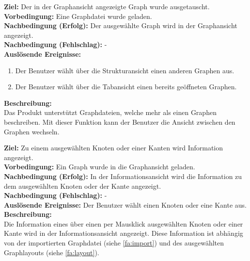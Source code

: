 \label{fa:graphwechsel}
\textbf{Ziel:} Der in der Graphansicht angezeigte Graph wurde ausgetauscht. \\
\textbf{Vorbedingung:} Eine Graphdatei wurde geladen.\\
\textbf{Nachbedingung (Erfolg):} Der ausgewählte Graph wird in der Graphansicht angezeigt.\\
\textbf{Nachbedingung (Fehlschlag):} -\\
\textbf{Auslösende Ereignisse:}
\begin{enumerate}[nolistsep, label=(\alph*)]
  \item Der Benutzer wählt über die Strukturansicht einen anderen Graphen aus.
  \item Der Benutzer wählt über die Tabansicht einen bereits geöffneten Graphen. %
\end{enumerate}
\textbf{Beschreibung:}\\
Das Produkt unterstützt Graphdateien, welche mehr als einen Graphen beschreiben.
Mit dieser Funktion kann der Benutzer die Ansicht zwischen den Graphen wechseln.

\label{fa:infoanzeige}
\textbf{Ziel:} Zu einem ausgewählten Knoten oder einer Kanten wird Information angezeigt.\\
\textbf{Vorbedingung:} Ein Graph wurde in die Graphansicht geladen.\\
\textbf{Nachbedingung (Erfolg):} In der Informationsansicht wird die Information zu dem ausgewählten Knoten oder der Kante angezeigt.\\
\textbf{Nachbedingung (Fehlschlag):} -\\
\textbf{Auslösende Ereignisse:} Der Benutzer wählt einen Knoten oder eine Kante aus.\\
\textbf{Beschreibung:}\\
Die Information eines über einen per Mausklick ausgewählten Knoten oder einer Kante wird in der Informationsansicht angezeigt. Diese Information ist abhängig von der importierten Graphdatei (siehe \ref{fa:import}) und des ausgewählten Graphlayouts (siehe \ref{fa:layout}).

